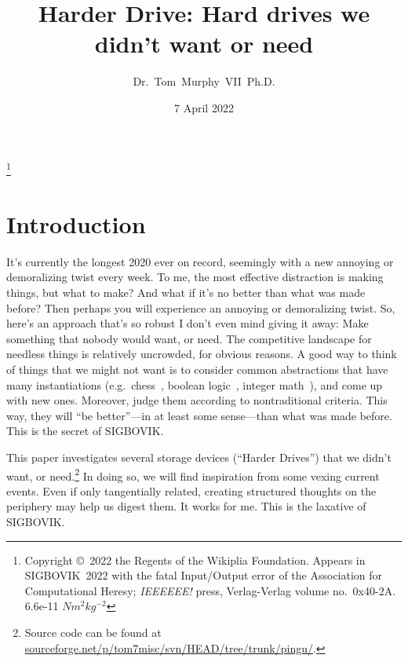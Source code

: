 \documentclass[twocolumn]{article}
\begin{document}
\title{Harder Drive: Hard drives we didn't want or need}
\author{Dr.~Tom~Murphy~VII~Ph.D.}\thanks{
Copyright \copyright\ 2022 the Regents of the Wikiplia Foundation.
Appears in SIGBOVIK~2022 with the
fatal Input/Output error of the Association for Computational Heresy; {\em IEEEEEE!}
press, Verlag-Verlag volume no.~0x40-2A. 6.6e-11 $N m^2kg^{-2}$
}

\renewcommand\th{\ensuremath{{}^{\textrm{th}}}}
\newcommand\st{\ensuremath{{}^{\textrm{st}}}}
\newcommand\rd{\ensuremath{{}^{\textrm{rd}}}}
\newcommand\nd{\ensuremath{{}^{\textrm{nd}}}}

\renewcommand\paragraph[1]{\smallskip \noindent{\bf #1}\enspace}

\date{7 April 2022}

\maketitle \thispagestyle{empty}

\sloppypar


\section{Introduction}

It's currently the longest 2020 ever on record, seemingly with a new
annoying or demoralizing twist every week. To me, the most effective
distraction is making things, but what to make? And what if it's no
better than what was made before? Then perhaps you will experience an
annoying or demoralizing twist. So, here's an approach that's so
robust I don't even mind giving it away: Make something that nobody
would want, or need. The competitive landscape for needless things is
relatively uncrowded, for obvious reasons. A good way to think of
things that we might not want is to consider common abstractions that
have many instantiations (e.g.~chess~\cite{murphy2019eloworld},
boolean logic~\cite{murphy2019nan}, integer
math~\cite{mccann2018fluint}), and come up with new ones. Moreover,
judge them according to nontraditional criteria. This way, they will
``be better''---in at least some sense---than what was made before.
This is the secret of SIGBOVIK.

This paper investigates several storage devices (``Harder Drives'')
that we didn't want, or need.\footnote{ Source code can be found at
  \url{sourceforge.net/p/tom7misc/svn/HEAD/tree/trunk/pingu/}. } In
doing so, we will find inspiration from some vexing current events.
Even if only tangentially related, creating structured thoughts on the
periphery may help us digest them. It works for me. This is the
laxative of SIGBOVIK.
\end{document}
